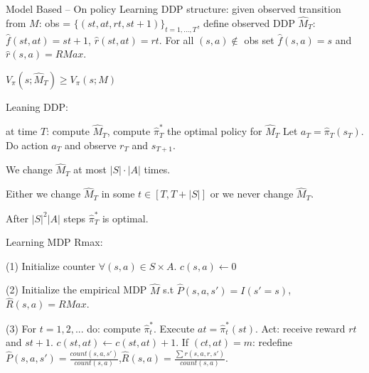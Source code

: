
\begin{deff}
Model Based – On policy Learning DDP structure: given observed transition from $M$: obs = $\{(st, at, rt, st+1)\}_{t=1,...,T}$, define observed DDP $\hat{M}_T$: $\hat{f}(st, at) = st+1$, $\hat{r}(st, at) = rt$. For all $(s, a) \notin$ obs set $\hat{f}(s, a) = s$ and $\hat{r}(s, a) = RMax$.
\end{deff}
\begin{clm}
$V_{\pi}(s; \hat{M}_T) \geq V_{\pi}(s; M)$
\end{clm}

\begin{greyboxedalgorithm}
\vspace{-0.5cm}
\begin{algorithm}[H]
\caption{Leaning DDP:  }
\begin{footnotesize}
\begin{algorithmic}[1]
\STATE at time $T$: compute $\hat{M}_T$, compute $\hat{\pi}_T^*$ the optimal policy for $\hat{M}_T$
\STATE Let $a_T = \hat{\pi}_T(s_T)$. Do action $a_T$ and observe $r_T$ and $s_{T+1}$.
\end{algorithmic}
\end{footnotesize}
\end{algorithm}
\end{greyboxedalgorithm}
\begin{clm}
We change $\hat{M}_T$ at most $|S| \cdot |A|$ times.
\end{clm}
\pagebreak

\begin{clm}
Either we change $\hat{M}_T$ in some $t \in [T, T + |S|]$ or we never change $\hat{M}_T$.
\end{clm}

\begin{clm}
After $|S|^2 |A|$ steps $\hat{\pi}_T^*$ is optimal.
\end{clm}

\begin{deff}
Learning MDP Rmax: 

(1) Initialize counter $\forall(s, a) \in S \times A$. $c(s, a) \leftarrow 0$ 

(2) Initialize the empirical MDP $\hat{M}$ s.t $\hat{P}(s, a, s') = I(s' = s)$, $\hat{R}(s, a) = RMax$. 

(3) For $t = 1,2, ...$ do: compute $\hat{\pi}_t^*$. Execute $at = \hat{\pi}_t^*(st)$. Act: receive reward $rt$ and $st+1$. $c(st, at) \leftarrow c(st, at) + 1$. If $(ct, at) = m$: redefine $\hat{P}(s, a, s') = \frac{count(s,a,s')}{count(s,a)}$,$\hat{R}(s, a) = \frac{\sum r (s,a,r,s')}{count(s,a)}$.
\end{deff}

